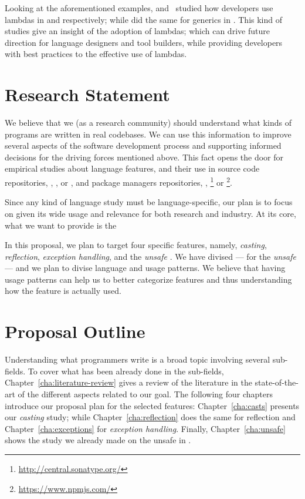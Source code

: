 Looking at the aforementioned examples, \cite{mazinanian_understanding_2017} and~\cite{uesbeck_empirical_2016}
studied how developers use lambdas in \java{} and \cpp{} respectively; while \cite{parnin_java_2011,parnin_adoption_2013} did the same for generics in \java{}.
This kind of studies give an insight of the adoption of lambdas;
which can drive future direction for language designers and tool builders,
while providing developers with best practices to the effective use of lambdas.


\section{Research Statement}

We believe that we (as a research community) should understand what kinds of programs are written in real codebases.
We can use this information to improve several aspects of the software development process and supporting informed decisions for the driving forces mentioned above.
This fact opens the door for empirical studies about language features, and their use in source code repositories, \eg{}, \github{}, \gitlab{} or \bitbucket{}, and package managers repositories, \eg{}, \mavencentral{}\footnote{\url{http://central.sonatype.org/}} or
\npm{}\footnote{\url{https://www.npmjs.com/}}.

Since any kind of language study must be language-specific, our plan is to focus on \java{} given its wide usage and relevance for both research and industry.
At its core, what we want to provide is the


In this proposal, we plan to target four specific \java{} features, namely, \emph{casting}, \emph{reflection}, \emph{exception handling}, and the \emph{unsafe \api{}}.
We have divised --- for the \emph{unsafe} \api{} --- and we plan to divise language and \api{} usage patterns.
We believe that having usage patterns can help us to better categorize features and thus understanding how the feature is actually used.

\section{Proposal Outline}

Understanding what programmers write is a broad topic involving several sub-fields.
To cover what has been already done in the sub-fields, Chapter~\ref{cha:literature-review} gives a review of the literature in the state-of-the-art of the different aspects related to our goal. 
The following four chapters introduce our proposal plan for the selected features:
Chapter~\ref{cha:casts} presents our \emph{casting} study;
while Chapter~\ref{cha:reflection} does the same for reflection and
Chapter~\ref{cha:exceptions} for \emph{exception handling}.
Finally, Chapter~\ref{cha:unsafe} shows the study we already made on the unsafe \api{} in \java{}.

